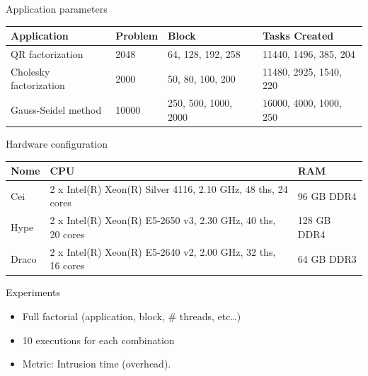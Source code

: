 \documentclass[presentation, aspectratio=169, 14pt]{beamer}
\begin{document}
\begin{frame}[label={sec:org3168c3c}]{Application parameters}
\footnotesize
\begin{center}
\begin{tabular}{llll}
\toprule
\alert{Application} & \alert{Problem} & \alert{Block} & \alert{Tasks Created}\\
\midrule
QR factorization & 2048 & 64, 128, 192, 258 & 11440, 1496, 385, 204\\
Cholesky factorization & 2000 & 50, 80, 100, 200 & 11480, 2925, 1540, 220\\
Gauss-Seidel method & 10000 & 250, 500, 1000, 2000 & 16000, 4000, 1000, 250\\
\bottomrule
\end{tabular}
\end{center}
\end{frame}

\begin{frame}[label={sec:org6d5c5ce}]{Hardware configuration}
\footnotesize
\begin{center}
\begin{tabular}{lll}
\toprule
\alert{Nome} & \alert{CPU} & \alert{RAM}\\
\midrule
Cei & 2 x Intel(R) Xeon(R) Silver 4116, 2.10 GHz, 48 ths, 24 cores & 96 GB DDR4\\
Hype & 2 x Intel(R) Xeon(R) E5-2650 v3, 2.30 GHz, 40 ths, 20 cores & 128 GB DDR4\\
Draco & 2 x Intel(R) Xeon(R) E5-2640 v2, 2.00 GHz, 32 ths, 16 cores & 64 GB DDR3\\
\bottomrule
\end{tabular}
\end{center}
\end{frame}

\begin{frame}[label={sec:orgbcdeaee}]{Experiments}
\begin{itemize}
\item Full factorial (application, block, \# threads, etc\ldots{})
\end{itemize}
\hfill \pause
\begin{itemize}
\item 10 executions for each combination
\end{itemize}
\hfill \pause
\begin{itemize}
\item Metric: Intrusion time (overhead).
\end{itemize}
\end{frame}
\end{document}
